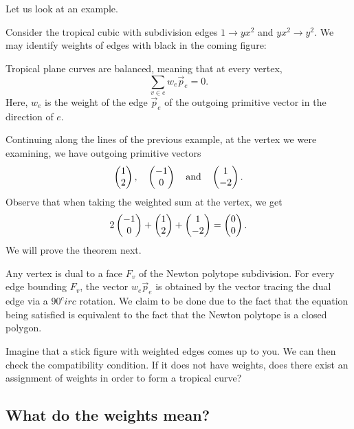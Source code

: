 \documentclass[12pt]{memoir}
\theoremstyle{definition}
\begin{document}
Let us look at an example. 

\begin{Ex}
    Consider the tropical cubic with subdivision edges $1\to yx^2$ and $yx^2\to y^2$. We may identify weights of edges with black in the coming figure:
    \begin{figure}[h!]
        \centering
    \end{figure}
\end{Ex}

\begin{Th}
Tropical plane curves are balanced, meaning that at every vertex,
$$\sum_{v\in e}w_e\vec p_e=0.$$
Here, $w_e$ is the weight of the edge $\vec p_e$ of the outgoing primitive vector in the direction of $e$.
\end{Th}

Continuing along the lines of the previous example, at the vertex we were examining, we have outgoing primitive vectors 
$$\begin{pmatrix} 1 \\ 2 \end{pmatrix},\quad\begin{pmatrix} -1 \\ 0 \end{pmatrix}\quad\text{and}\quad\begin{pmatrix} 1 \\ -2 \end{pmatrix}.$$
Observe that when taking the weighted sum at the vertex, we get 
$$2\begin{pmatrix} -1 \\ 0 \end{pmatrix}+\begin{pmatrix} 1 \\ 2 \end{pmatrix}+\begin{pmatrix} 1 \\ -2 \end{pmatrix}=\begin{pmatrix} 0 \\ 0 \end{pmatrix}.$$
We will prove the theorem next.

\begin{ptcbp}
Any vertex is dual to a face $F_v$ of the Newton polytope subdivision.
For every edge bounding $F_v$, the vector $w_e\vec p_e$ is obtained by the vector tracing the dual edge via a $90^circ$ rotation. We claim to be done due to the fact that the equation being satisfied is equivalent to the fact that the Newton polytope is a closed polygon.
\end{ptcbp}

Imagine that a stick figure with weighted edges comes up to you. We can then check the compatibility condition. If it does not have weights, does there exist an assignment of weights in order to form a tropical curve? 

\subsection{What do the weights mean?}
\end{document}
